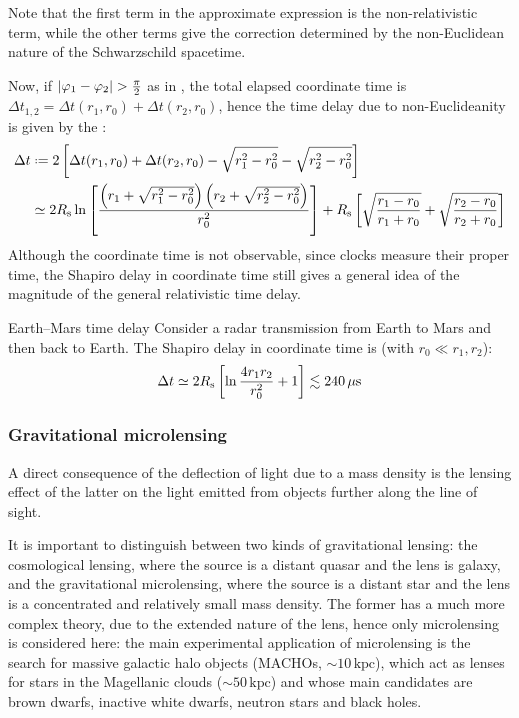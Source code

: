 Note that the first term in the approximate expression is the non-relativistic term, while the other terms give the correction determined by the non-Euclidean nature of the Schwarzschild spacetime.

Now, if $ \left\lvert\varphi_1 - \varphi_2\right\rvert > \frac{\pi}{2} $ as in , the total elapsed coordinate time is $ \Delta t_{1,2} = \Delta t(r_1 , r_0) + \Delta t(r_2 , r_0) $, hence the time delay due to non-Euclideanity is given by the :
\begin{equation}
  \begin{split}
    \Delta t
    & \defeq 2 \left[ \Delta t(r_1 , r_0) + \Delta t(r_2 , r_0) - \sqrt{r_1^2 - r_0^2} - \sqrt{r_2^2 - r_0^2} \right] \\
    & \simeq 2\sr \ln \left[ \frac{\left( r_1 + \sqrt{r_1^2 - r_0^2} \right) \left( r_2 + \sqrt{r_2^2 - r_0^2} \right)}{r_0^2} \right] + \sr \left[ \sqrt{\frac{r_1 - r_0}{r_1 + r_0}} + \sqrt{\frac{r_2 - r_0}{r_2 + r_0}} \right]
  \end{split}
\end{equation}
Although the coordinate time is not observable, since clocks measure their proper time, the Shapiro delay in coordinate time still gives a general idea of the magnitude of the general relativistic time delay.

\begin{example}{Earth--Mars time delay}{}
  Consider a radar transmission from Earth to Mars and then back to Earth. The Shapiro delay in coordinate time is (with $ r_0 \ll r_1 , r_2 $):
  \begin{equation*}
    \Delta t \simeq 2R_\text{s} \left[ \ln \frac{4 r_1 r_2}{r_0^2} + 1 \right] \lesssim 240 \, \mu\text{s}
  \end{equation*}
\end{example}

\subsubsection{Gravitational microlensing}

A direct consequence of the deflection of light due to a mass density is the lensing effect of the latter on the light emitted from objects further along the line of sight.

It is important to distinguish between two kinds of gravitational lensing: the cosmological lensing, where the source is a distant quasar and the lens is galaxy, and the gravitational microlensing, where the source is a distant star and the lens is a concentrated and relatively small mass density. The former has a much more complex theory, due to the extended nature of the lens, hence only microlensing is considered here: the main experimental application of microlensing is the search for massive galactic halo objects (MACHOs, $ \sim 10 \,\text{kpc} $), which act as lenses for stars in the Magellanic clouds ($ \sim 50 \,\text{kpc} $) and whose main candidates are brown dwarfs, inactive white dwarfs, neutron stars and black holes.

